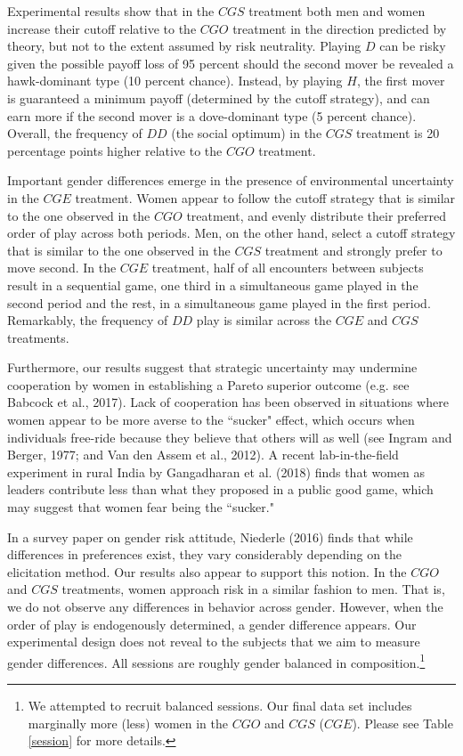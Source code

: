\documentclass[11pt,english]{article}
\begin{document}
Experimental results show that in the $CGS$ treatment both men and women increase their cutoff relative to the $CGO$ treatment in the direction predicted by theory, but not to the extent assumed by risk neutrality. Playing $D$ can be risky given the possible payoff loss of 95 percent should the second mover be revealed a hawk-dominant type (10 percent chance). Instead, by playing $H$, the first mover is guaranteed a minimum payoff (determined by the cutoff strategy), and can earn more if the second mover is a dove-dominant type (5 percent chance). Overall, the frequency of $DD$ (the social optimum) in the $CGS$ treatment is 20 percentage points higher relative to the $CGO$ treatment. 

 Important gender differences emerge in the presence of environmental uncertainty in the $CGE$ treatment. Women appear to follow the cutoff strategy that is similar to the one observed in the $CGO$ treatment, and evenly distribute their preferred order of play across both periods. Men, on the other hand, select a cutoff strategy that is similar to the one observed in the $CGS$ treatment and strongly prefer to move second. In the $CGE$ treatment, half of all encounters between subjects result in a sequential game, one third in a simultaneous game played in the second period and the rest, in a simultaneous game played in the first period. Remarkably, the frequency of $DD$ play is similar across the $CGE$ and $CGS$ treatments.

Furthermore, our results suggest that strategic uncertainty may undermine cooperation by women in establishing a Pareto superior outcome (e.g. see Babcock et al., 2017). Lack of cooperation has been observed in situations where women appear to be more averse to the ``sucker" effect, which occurs when individuals free-ride because they believe that others will as well (see Ingram and Berger, 1977; and Van den Assem et al., 2012). A recent lab-in-the-field experiment in rural India by Gangadharan et al. (2018) finds that women as leaders contribute less than what they proposed in a public good game, which may suggest that women fear being the ``sucker." 


In a survey paper on gender risk attitude, Niederle (2016) finds that while differences in preferences exist, they vary considerably depending on the elicitation method. Our results also appear to support this notion. In the $CGO$ and $CGS$ treatments, women approach risk in a similar fashion to men. That is, we do not observe any differences in behavior across gender. However, when the order of play is endogenously determined, a gender difference appears. Our experimental design does not reveal to the subjects that we aim to measure gender differences. All sessions are roughly gender balanced in composition.\footnote{We attempted to recruit balanced sessions. Our final data set includes marginally more (less) women in the $CGO$ and $CGS$ ($CGE$). Please see Table \ref{session} for more details.}
\end{document}
